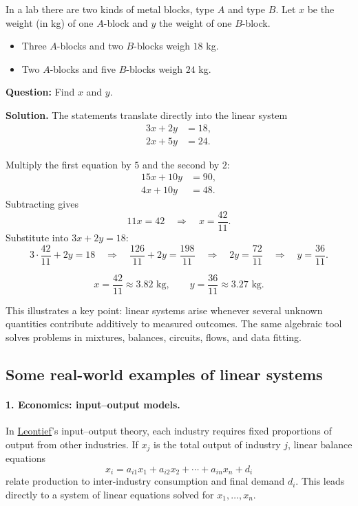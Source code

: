 \begin{example}

In a lab there are two kinds of metal blocks, type $A$ and type $B$.
Let $x$ be the weight (in kg) of one $A$-block and $y$ the weight of one
$B$-block.

\begin{itemize}
    \item Three $A$-blocks and two $B$-blocks weigh $18$ kg.
    \item Two $A$-blocks and five $B$-blocks weigh $24$ kg.
\end{itemize}

\noindent
\textbf{Question:} Find $x$ and $y$.

\medskip
\noindent
\textbf{Solution.}
The statements translate directly into the linear system
\[
\begin{aligned}
3x + 2y &= 18,\\
2x + 5y &= 24.
\end{aligned}
\]

Multiply the first equation by $5$ and the second by $2$:
\[
\begin{aligned}
15x + 10y &= 90,\\
4x + 10y  &= 48.
\end{aligned}
\]
Subtracting gives
\[
11x = 42 \quad\Rightarrow\quad x=\frac{42}{11}.
\]
Substitute into $3x+2y=18$:
\[
3\cdot\frac{42}{11}+2y=18
\quad\Rightarrow\quad
\frac{126}{11}+2y=\frac{198}{11}
\quad\Rightarrow\quad
2y=\frac{72}{11}
\quad\Rightarrow\quad
y=\frac{36}{11}.
\]

\[
\boxed{
x=\frac{42}{11}\approx 3.82\text{ kg},\qquad
y=\frac{36}{11}\approx 3.27\text{ kg}.
}
\]
\end{example}
\medskip
This illustrates a key point: linear systems arise whenever several unknown
quantities contribute additively to measured outcomes.  The same algebraic
tool solves problems in mixtures, balances, circuits, flows, and data fitting.
\subsection{Some real-world examples of linear systems}

\paragraph{1. Economics: input--output models.}
In \href{https://en.wikipedia.org/wiki/Wassily_Leontief}{Leontief}'s input--output theory, each industry requires fixed proportions
of output from other industries.  If $x_j$ is the total output of industry
$j$, linear balance equations
\[
x_i = a_{i1}x_1 + a_{i2}x_2 + \cdots + a_{in}x_n + d_i
\]
relate production to inter-industry consumption and final demand $d_i$.
This leads directly to a system of linear equations solved for $x_1,\dots,x_n$.


